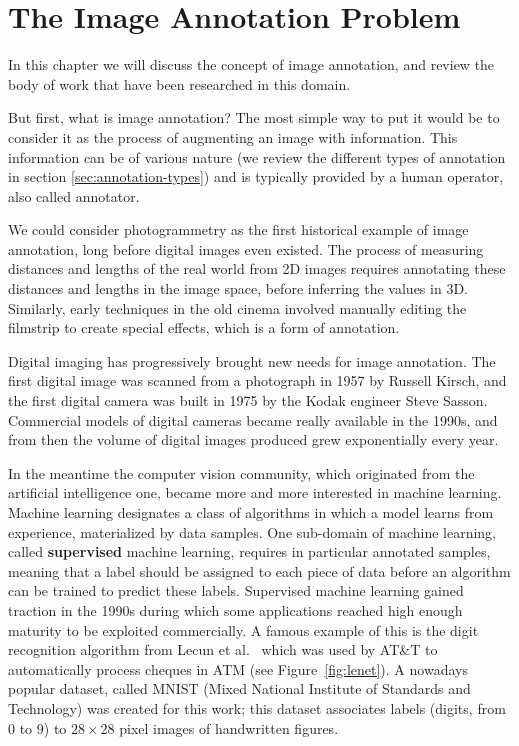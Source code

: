 \chapter{The Image Annotation Problem}%
\label{cha:the_image_annotation_problem}

\adjustmtc
\minitoc%

\newpage
In this chapter we will discuss the concept of image annotation,
and review the body of work that have been researched in this domain.

But first, what is image annotation?
The most simple way to put it would be to consider it as
the process of augmenting an image with information.
This information can be of various nature
(we review the different types of annotation in section \ref{sec:annotation-types})
and is typically provided by a human operator, also called annotator.

We could consider photogrammetry as the first historical example of image annotation,
long before digital images even existed.
The process of measuring distances and lengths of the real world
from 2D images requires annotating these distances and lengths in the image space,
before inferring the values in 3D.
Similarly, early techniques in the old cinema involved
manually editing the filmstrip to create special effects, which is a form of annotation.

Digital imaging has progressively brought new needs for image annotation.
The first digital image was scanned from a photograph in 1957 by Russell Kirsch,
and the first digital camera was built in 1975 by the Kodak engineer Steve Sasson.
Commercial models of digital cameras became really available in the 1990s,
and from then the volume of digital images produced grew exponentially every year.

In the meantime the computer vision community,
which originated from the artificial intelligence one,
became more and more interested in machine learning.
Machine learning designates a class of algorithms in which a model learns from experience,
materialized by data samples.
One sub-domain of machine learning, called \textbf{supervised} machine learning,
requires in particular annotated samples,
meaning that a label should be assigned to each piece of data before
an algorithm can be trained to predict these labels.
Supervised machine learning gained traction in the 1990s during which
some applications reached high enough maturity to be exploited commercially.
A famous example of this is the digit recognition algorithm from
Lecun et al.~\cite{lecun1998gradient} which was used by AT\&T
to automatically process cheques in ATM (see Figure~\ref{fig:lenet}).
A nowadays popular dataset,
called MNIST (Mixed National Institute of Standards and Technology)
was created for this work;
this dataset associates labels (digits, from 0 to 9)
to $28\times 28$ pixel images of handwritten figures.


